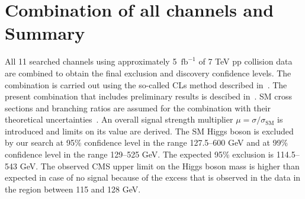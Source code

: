\documentclass{cimento}
\newcommand{\fbinv} {\mbox{\ensuremath{\,\text{fb}^\text{$-$1}}}\xspace}
\begin{document}




\section{Combination of all channels and Summary}
\label{sec:Results}

All 11 searched channels using
approximately 5 \fbinv of 7 TeV pp collision data
are combined to obtain the final exclusion and
discovery confidence levels.  The combination is carried out using the
so-called CLs method described in~\cite{LHClimits}.  The present
combination that includes preliminary results is descibed
in~\cite{HIG-12-008}.  SM cross sections and branching ratios are
assumed for the combination with their theoretical
uncertainties~\cite{Dittmaier:2012vm}. An overall
signal strength multiplier $\mu=\sigma/\sigma_{\mathrm{SM}}$ is
introduced and limits on its value are derived.
The SM Higgs boson is excluded
by our search at 95\% confidence level in the range 127.5--600 GeV and
at 99\% confidence level in the range 129--525 GeV.  The expected 95\%
exclusion is 114.5--543 GeV.  The observed CMS upper limit on the
Higgs boson mass is higher than expected in case of no signal because
of the excess that is observed in the data in the region between 115
and 128 GeV.
\end{document}
